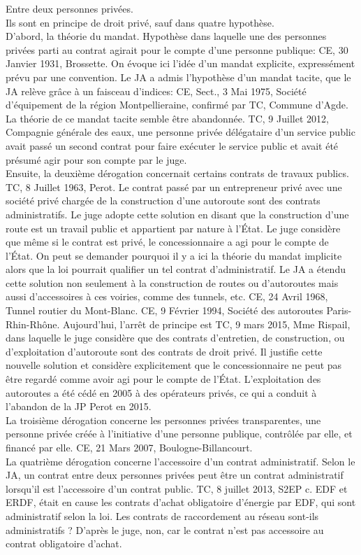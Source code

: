 \documentclass[10pt, a4paper, openany]{book}
\begin{document}
Entre deux personnes privées. \\
Ils sont en principe de droit privé, sauf dans quatre hypothèse. \\
D'abord, la théorie du mandat. Hypothèse dans laquelle une des personnes privées parti au contrat agirait pour le compte d'une personne publique: CE, 30 Janvier 1931, Brossette. On évoque ici l'idée d'un mandat explicite, expressément prévu par une convention. Le JA a admis l'hypothèse d'un mandat tacite, que le JA relève grâce à un faisceau d'indices: CE, Sect., 3 Mai 1975, Société d'équipement de la région Montpellieraine, confirmé par TC, Commune d'Agde. La théorie de ce mandat tacite semble être abandonnée. TC, 9 Juillet 2012, Compagnie générale des eaux, une personne privée délégataire d'un service public avait passé un second contrat pour faire exécuter le service public et avait été présumé agir pour son compte par le juge. \\
Ensuite, la deuxième dérogation concernait certains contrats de travaux publics. TC, 8 Juillet 1963, Perot. Le contrat passé par un entrepreneur privé avec une société privé chargée de la construction d'une autoroute sont des contrats administratifs. Le juge adopte cette solution en disant que la construction d'une route est un travail public et appartient par nature à l'État. Le juge considère que même si le contrat est privé, le concessionnaire a agi pour le compte de l'État. On peut se demander pourquoi il y a ici la théorie du mandat implicite alors que la loi pourrait qualifier un tel contrat d'administratif. Le JA a étendu cette solution non seulement à la construction de routes ou d'autoroutes mais aussi d'accessoires à ces voiries, comme des tunnels, etc. CE, 24 Avril 1968, Tunnel routier du Mont-Blanc. CE, 9 Février 1994, Société des autoroutes Paris-Rhin-Rhône. Aujourd'hui, l'arrêt de principe est TC, 9 mars 2015, Mme Rispail, dans laquelle le juge considère que des contrats d'entretien, de construction, ou d'exploitation d'autoroute sont des contrats de droit privé. Il justifie cette nouvelle solution et considère explicitement que le concessionnaire ne peut pas être regardé comme avoir agi pour le compte de l'État. L'exploitation des autoroutes a été cédé en 2005 à des opérateurs privés, ce qui a conduit à l'abandon de la JP Perot en 2015. \\
La troisième dérogation concerne les personnes privées transparentes, une personne privée créée à l'initiative d'une personne publique, contrôlée par elle, et financé par elle. CE, 21 Mars 2007, Boulogne-Billancourt. \\
La quatrième dérogation concerne l'accessoire d'un contrat administratif. Selon le JA, un contrat entre deux personnes privées peut être un contrat administratif lorsqu'il est l'accessoire d'un contrat public. TC, 8 juillet 2013, S2EP c. EDF et ERDF, était en cause les contrats d'achat obligatoire d'énergie par EDF, qui sont administratif selon la loi. Les contrats de raccordement au réseau sont-ils administratifs ? D'après le juge, non, car le contrat n'est pas accessoire au contrat obligatoire d'achat. 
\end{document}
